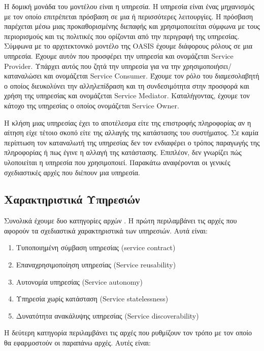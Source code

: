 Η δομική μονάδα του μοντέλου είναι η υπηρεσία. Η υπηρεσία είναι ένας 
μηχανισμός με τον οποίο επιτρέπεται πρόσβαση σε μια ή περισσότερες 
λειτουργίες. Η πρόσβαση παρέχεται μέσω μιας προκαθορισμένης διεπαφής και 
χρησιμοποιείται σύμφωνα με τους περιορισμούς και τις πολιτικές που 
ορίζονται από την περιγραφή της υπηρεσίας. Σύμφωνα με το αρχιτεκτονικό 
μοντέλο της OASIS \citep{OASIS-soa-raf} 
έχουμε διάφορους ρόλους σε μια υπηρεσία. Έχουμε 
αυτόν που προσφέρει την υπηρεσία και ονομάζεται Service Provider. 
Υπάρχει αυτός που ζητά την υπηρεσία για να την 
χρησιμοποιήσει/καταναλώσει και ονομάζεται Service Consumer. Έχουμε τον 
ρόλο του διαμεσολαβητή ο οποίος διευκολύνει την αλληλεπίδραση και τη 
συνδεσιμότητα στην προσφορά και χρήση της υπηρεσίας και ονομάζεται 
Service Mediator. Καταλήγοντας, έχουμε τον κάτοχο της υπηρεσίας ο οποίος 
ονομάζεται Service Owner.

Η κλήση μιας υπηρεσίας έχει το αποτέλεσμα είτε της επιστροφής 
πληροφορίας αν η αίτηση είχε τέτοιο σκοπό είτε της αλλαγής της 
κατάστασης του συστήματος. Σε καμία περίπτωση τον καταναλωτή της 
υπηρεσίας δεν τον ενδιαφέρει ο τρόπος παραγωγής της πληροφορίας ή πως 
έγινε η αλλαγή της κατάστασης. Επιπλέον, δεν γνωρίζει πώς υλοποιείται η 
υπηρεσία που χρησιμοποιεί. Παρακάτω αναφέρονται οι γενικές σχεδιαστικές 
αρχές που διέπουν μια υπηρεσία.

\subsection{Χαρακτηριστικά Υπηρεσιών}

Συνολικά έχουμε δυο κατηγορίες αρχών \citep{Duggan2012}. Η πρώτη 
περιλαμβάνει τις αρχές που αφορούν τα σχεδιαστικά χαρακτηριστικά των 
υπηρεσιών. Αυτά είναι:

\begin{enumerate}
\item Τυποποιημένη σύμβαση υπηρεσίας (service contract)
\item Επαναχρησιμοποίηση υπηρεσίας (Service reusability)
\item Αυτονομία υπηρεσίας (Service autonomy)
\item Υπηρεσία χωρίς κατάσταση (Service statelessness)
\item Δυνατότητα ανακάλυψης υπηρεσίας (Service discoverability)
\setcounter{numberedCntI}{\theenumi}
\end{enumerate}

Η δεύτερη κατηγορία περιλαμβάνει τις αρχές που ρυθμίζουν τον τρόπο με 
τον οποίο θα εφαρμοστούν οι παραπάνω αρχές. Αυτές είναι:

